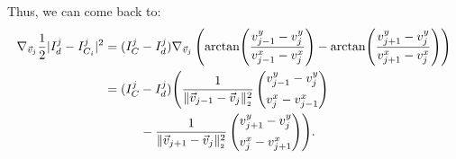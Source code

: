 \begin{proposition}
	Thus, we can come back to: 
	\begin{align*}
		\nabla_{\vec{v}_j} \frac{1}{2}| I^{j}_d - I^{j}_{C_i} |^2 
		&= (I^j_{C} - I^{j}_d) \nabla_{\vec{v}_j} \left(\arctan\!\left(\frac{v_{j-1}^{y} - v_{j}^{y}}{v_{j-1}^{x} - v_{j}^{x}}\right) - \arctan\!\left(\frac{v_{j+1}^{y} - v_{j}^{y}}{v_{j+1}^{x} - v_{j}^{x}}\right)\right) \\
		&= (I^j_{C} - I^{j}_d) \Biggl( 
		  \frac{1}{\norm[\vec{v}_{j-1} - \vec{v}_j]^2} \begin{pmatrix}
			v_{j-1}^{y} - v_{j}^{y} \\[0.5em]
			v_{j}^{x} - v_{j-1}^{x}
		\end{pmatrix} \\
		&\hspace{1cm} - \frac{1}{\norm[\vec{v}_{j+1} - \vec{v}_j]^2} \begin{pmatrix}
			v_{j+1}^{y} - v_{j}^{y} \\[0.5em]
			v_{j}^{x} - v_{j+1}^{x}
		\end{pmatrix} \Biggr).
	\end{align*}


\end{proposition}
